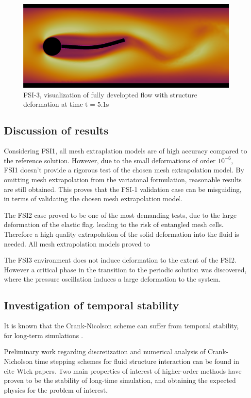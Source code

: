 \begin{figure}[h!]
  \centering
    \includegraphics[scale=0.2]{./Fig/fsi3flow.png}
      \caption{FSI-3, visualization of fully developted flow with structure deformation at time t = 5.1s}
\end{figure}

\newpage
\subsection{Discussion of results}
Considering FSI1, all mesh extraplation models are of high accuracy compared to the reference solution.  However, due to the small deformations of order $10^{-6}$, FSI1 doesn't provide a rigorous test of the chosen mesh extrapolation model. By omitting mesh extrapolation from the variatonal formulation,  reasonable results are still obtained. This proves that the FSI-1 validation case can be misguiding, in terms of validating the chosen mesh extrapolation model. 

The FSI2 case proved to be one of the most demanding tests, due to the large deformation of the elastic flag. leading to the risk of entangled mesh cells. Therefore a high quality extrapolation of the solid deformation into the fluid is needed. All mesh extrapolation models proved to

The FSI3 environment does not induce deformation to the extent of the FSI2. However a critical phase in the transition to the periodic solution was discovered, where the pressure oscillation induces a large deformation to the system.

\subsection{Investigation of temporal stability}
It is known that the Crank-Nicolson scheme can suffer from temporal stability, for long-term simulations \cite{Wick2013a}.

Preliminary work regarding discretization and numerical analysis of Crank-Nicholson time stepping schemes for fluid structure interaction can be found in cite WIck papers. Two main properties of interest of higher-order methods have proven to be the stability of long-time simulation, and obtaining the expected physics for the problem of interest.

